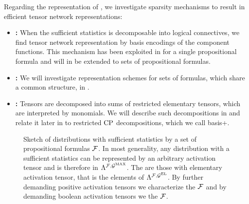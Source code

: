 Regarding the representation of \HybridLogicNetworks{}, we investigate sparsity mechanisms to result in efficient tensor network representations:
\begin{itemize}
	\item \textbf{\DecompositionSparsity{}:} When the sufficient statistics is decomposable into logical connectives, we find tensor network representation by basis encodings of the component functions.
    This mechanism has been exploited in  for a single propositional formula and will in  be extended to sets of propositional formulas.
    \item \textbf{\SelectionSparsity{}:} We will investigate representation schemes for sets of formulas, which share a common structure, in .
    \item \textbf{\PolynomialSparsity{}:} Tensors are decomposed into sums of restricted elementary tensors, which are interpreted by monomials.
    We will describe such decompositions in  and relate it later in  to restricted $\mathrm{CP}$ decompositions, which we call basis+.
\end{itemize}

\begin{figure}[t]
    \begin{center}
        
    \end{center}
    \caption{Sketch of distributions with sufficient statistics by a set of propositional formulas $\mathcal{F}$.
    In most generality, any distribution with a sufficient statistics can be represented by an arbitrary activation tensor and is therefore in $\Lambda^{\mathcal{F},\mathcal{G}^{\mathrm{MAX}}}$.
    The \HybridLogicNetworks{} are those with elementary activation tensor, that is the elements of $\Lambda^{\mathcal{F},\mathcal{G}^{\mathrm{EL}}}$.
    By further demanding positive activation tensors we characterize the \MarkovLogicNetworks{} $\mathcal{F}$ and by demanding boolean activation tensors we the \HardLogicNetworks{} $\mathcal{F}$.
    }
    \label{fig:elementaryComputableSketch}
\end{figure}


